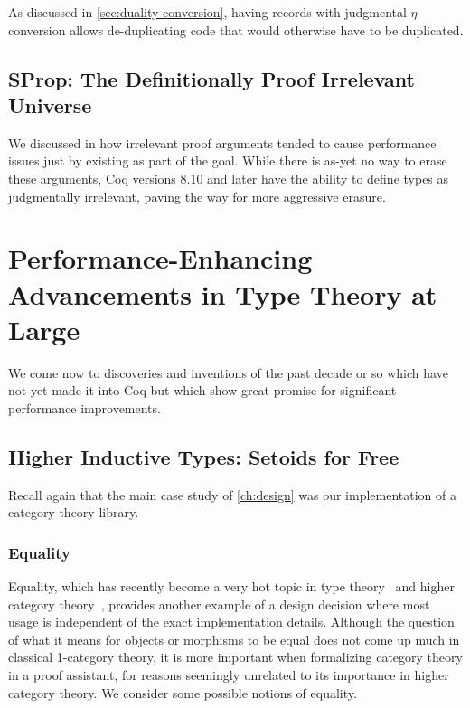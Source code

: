 As discussed in \autoref{sec:duality-conversion}, having records with judgmental $\eta$ conversion allows de-duplicating code that would otherwise have to be duplicated.

\subsection{SProp: The Definitionally Proof Irrelevant Universe}\label{sec:fixes:theory:sprop}\label{sec:sprop}
We discussed in  how irrelevant proof arguments tended to cause performance issues just by existing as part of the goal.
While there is as-yet no way to erase these arguments, Coq versions 8.10 and later have the ability to define types as judgmentally irrelevant, paving the way for more aggressive erasure.~\cite{coq-pr-sprop,sprop}

\section{Performance-Enhancing Advancements in Type Theory at Large}\label{sec:fixes:theory}
We come now to discoveries and inventions of the past decade or so which have not yet made it into Coq but which show great promise for significant performance improvements.

\subsection{Higher Inductive Types: Setoids for Free}\label{sec:fixes:theory:HITs}\label{sec:HITs}
Recall again that the main case study of \autoref{ch:design} was our implementation of a category theory library.

\subsubsection{Equality}\label{sec:equality}
Equality, which has recently become a very hot topic in type theory~\cite{HoTTBook} and higher category theory~\cite{Leinster2007}, provides another example of a design decision where most usage is independent of the exact implementation details.
Although the question of what it means for objects or morphisms to be equal does not come up much in classical 1-category theory, it is more important when formalizing category theory in a proof assistant, for reasons seemingly unrelated to its importance in higher category theory.
We consider some possible notions of equality.

